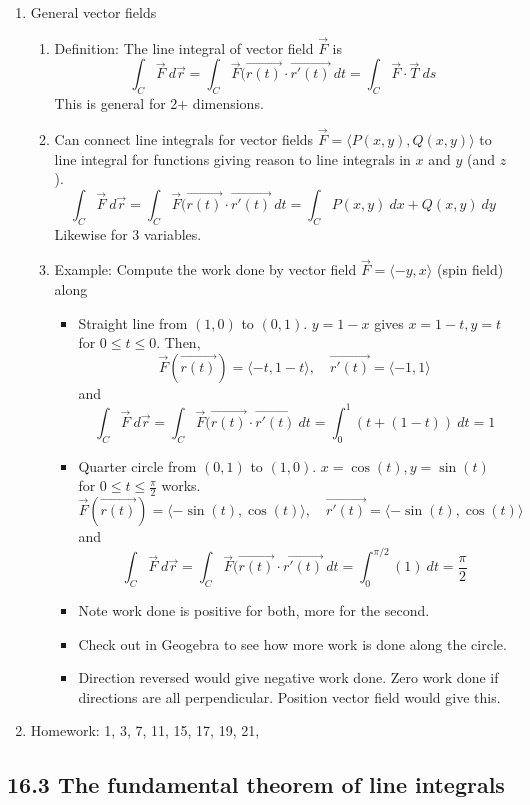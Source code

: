 \documentclass{article}
\begin{document}
\begin{enumerate}
\item General vector fields
\begin{enumerate}
\item Definition: The line integral of vector field $\vec{F}$ is 
\[
\int_C \vec{F} ~d\vec{r} = \int_C \vec{F}(\vec{r(t)} \cdot \vec{r'(t)} ~dt = \int_C \vec{F} \cdot \vec{T} ~ds 
\]
This is general for 2+ dimensions.
\item Can connect line integrals for vector fields $\vec{F} = \langle P(x,y), Q(x,y) \rangle$ to line integral for functions giving reason to line integrals in $x$ and $y$ (and $z$).
\[
\int_C \vec{F} ~d\vec{r} = \int_C \vec{F}(\vec{r(t)} \cdot \vec{r'(t)} ~dt =\int_C P(x,y) ~dx + Q(x,y) ~dy
\]
Likewise for 3 variables.
\item Example: Compute the work done by vector field $\vec{F} = \langle -y,x \rangle$ (spin field) along
\begin{itemize}
\item Straight line from $(1,0)$ to $(0,1)$. $y=1-x$ gives $x=1-t, y=t$ for $0 \leq t \leq 0$. Then,
\[
\vec{F}(\vec{r(t)}) = \langle -t, 1-t \rangle, \quad \vec{r'(t)} = \langle -1, 1 \rangle
\]
and
\[
\int_C \vec{F} ~d\vec{r} = \int_C \vec{F}(\vec{r(t)} \cdot \vec{r'(t)} ~dt = \int_0^1 \left(t+(1-t) \right) ~dt = 1
\]
\item Quarter circle from $(0,1)$ to $(1,0)$. $x=\cos(t), y=\sin(t)$ for $0 \leq t \leq \frac{\pi}{2}$ works.
\[
\vec{F}(\vec{r(t)}) = \langle -\sin(t),\cos(t) \rangle, \quad \vec{r'(t)} = \langle -\sin(t), \cos(t) \rangle
\]
and
\[
\int_C \vec{F} ~d\vec{r} = \int_C \vec{F}(\vec{r(t)} \cdot \vec{r'(t)} ~dt = \int_0^{\pi/2} \left(1 \right) ~dt = \frac{\pi}{2}
\]
\item Note work done is positive for both, more for the second.
\item Check out in Geogebra to see how more work is done along the circle. 
\item Direction reversed would give negative work done. Zero work done if directions are all perpendicular. Position vector field would give this.
\end{itemize}
\end{enumerate}

\item Homework: 1, 3, 7, 11, 15, 17, 19, 21, 

\end{enumerate}

\subsection{16.3 The fundamental theorem of line integrals}
\end{document}
